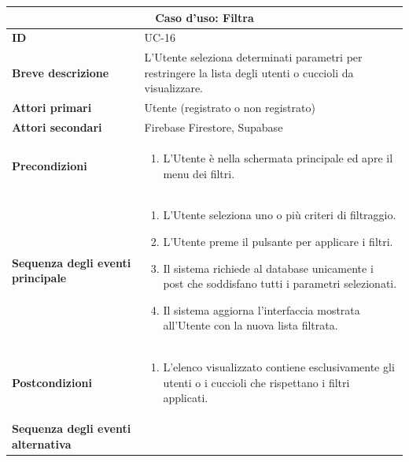 \documentclass[a4paper]{report}
\begin{document}
\begin{table}[H]
\vspace*{-0cm}
\renewcommand{\arraystretch}{1.9}
\begin{tabular}{|p{3.9cm}|p{9.9cm}|}
\hline
\multicolumn{2}{|c|}{\textbf{Caso d’uso: Filtra}} \\ \hline
\textbf{ID} & UC-16 \\ \hline
\textbf{Breve descrizione} & L'Utente seleziona determinati parametri per restringere la lista degli utenti o cuccioli da visualizzare. \\ \hline
\textbf{Attori primari} & Utente (registrato o non registrato) \\ \hline
\textbf{Attori secondari} & Firebase Firestore, Supabase \\ \hline
\textbf{Precondizioni} & \begin{enumerate}[leftmargin=14pt,label=\arabic*.,labelsep=0.5em,topsep=0pt,partopsep=0pt,parsep=0pt,itemsep=0pt]
    \item L'Utente è nella schermata principale ed apre il menu dei filtri.
\end{enumerate} \\ \hline
\textbf{Sequenza degli eventi principale} &
\begin{enumerate}[leftmargin=14pt,label=\arabic*.,labelsep=0.5em,topsep=0pt,partopsep=0pt,parsep=0pt,itemsep=0pt]
   \item L'Utente seleziona uno o più criteri di filtraggio.
   \item L'Utente preme il pulsante per applicare i filtri.
   \item Il sistema richiede al database unicamente i post che soddisfano tutti i parametri selezionati.
   \item Il sistema aggiorna l'interfaccia mostrata all'Utente con la nuova lista filtrata.
\end{enumerate}\\ \hline
\textbf{Postcondizioni} &
\begin{enumerate}[leftmargin=14pt,label=\arabic*.,labelsep=0.5em,topsep=0pt,partopsep=0pt,parsep=0pt,itemsep=0pt]
\item L'elenco visualizzato contiene esclusivamente gli utenti o i cuccioli che rispettano i filtri applicati.
\end{enumerate} \\ \hline
\textbf{Sequenza degli eventi alternativa} & \begin{enumerate}[leftmargin=14pt,label=\arabic*.,labelsep=0.5em,topsep=0pt,partopsep=0pt,parsep=0pt,itemsep=0pt]

\end{enumerate}
\end{tabular}
\end{table}
\end{document}
